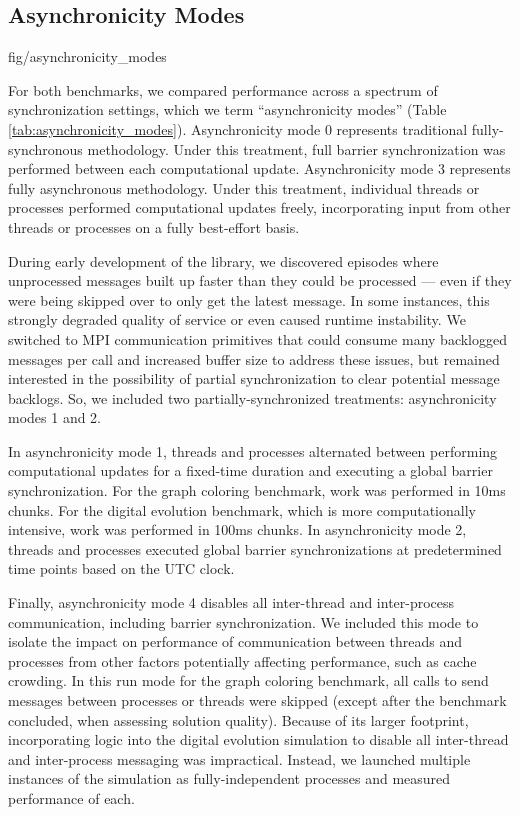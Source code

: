 \subsection{Asynchronicity Modes} \label{sec:asynchronicity_modes}

{fig/asynchronicity_modes}

For both benchmarks, we compared performance across a spectrum of synchronization settings, which we term ``asynchronicity modes'' (Table \ref{tab:asynchronicity_modes}).
Asynchronicity mode 0 represents traditional fully-synchronous methodology.
Under this treatment, full barrier synchronization was performed between each computational update.
Asynchronicity mode 3 represents fully asynchronous methodology.
Under this treatment, individual threads or processes performed computational updates freely, incorporating input from other threads or processes on a fully best-effort basis.

During early development of the library, we discovered episodes where unprocessed messages built up faster than they could be processed --- even if they were being skipped over to only get the latest message.
In some instances, this strongly degraded quality of service or even caused runtime instability.
We switched to MPI communication primitives that could consume many backlogged messages per call and increased buffer size to address these issues, but remained interested in the possibility of partial synchronization to clear potential message backlogs.
So, we included two partially-synchronized treatments: asynchronicity modes 1 and 2.

In asynchronicity mode 1, threads and processes alternated between performing computational updates for a fixed-time duration and executing a global barrier synchronization.
For the graph coloring benchmark, work was performed in 10ms chunks.
For the digital evolution benchmark, which is more computationally intensive, work was performed in 100ms chunks.
In asynchronicity mode 2, threads and processes executed global barrier synchronizations at predetermined time points based on the UTC clock.

Finally, asynchronicity mode 4 disables all inter-thread and inter-process communication, including barrier synchronization.
We included this mode to isolate the impact on performance of communication between threads and processes from other factors potentially affecting performance, such as cache crowding.
In this run mode for the graph coloring benchmark, all calls to send messages between processes or threads were skipped (except after the benchmark concluded, when assessing solution quality).
Because of its larger footprint, incorporating logic into the digital evolution simulation to disable all inter-thread and inter-process messaging was impractical.
Instead, we launched multiple instances of the simulation as fully-independent processes and measured performance of each.

